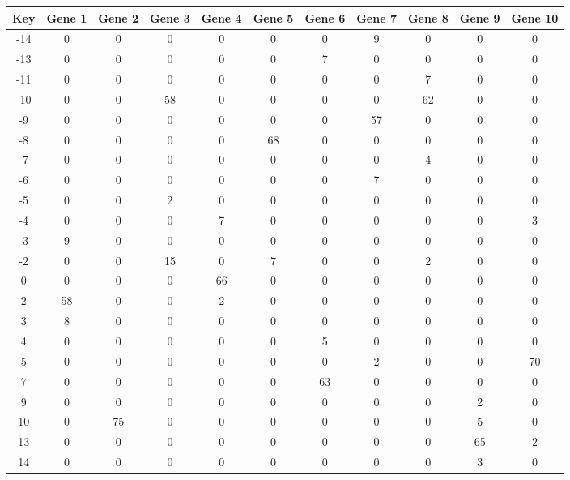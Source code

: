 \begin{tabular}{|c|c|c|c|c|c|c|c|c|c|c|}
\hline
Key & Gene 1 & Gene 2 & Gene 3 & Gene 4 & Gene 5 & Gene 6 & Gene 7 & Gene 8 & Gene 9 & Gene 10 \\
\hline
-14 & 0 & 0 & 0 & 0 & 0 & 0 & 9 & 0 & 0 & 0 \\
-13 & 0 & 0 & 0 & 0 & 0 & 7 & 0 & 0 & 0 & 0 \\
-11 & 0 & 0 & 0 & 0 & 0 & 0 & 0 & 7 & 0 & 0 \\
-10 & 0 & 0 & 58 & 0 & 0 & 0 & 0 & 62 & 0 & 0 \\
-9 & 0 & 0 & 0 & 0 & 0 & 0 & 57 & 0 & 0 & 0 \\
-8 & 0 & 0 & 0 & 0 & 68 & 0 & 0 & 0 & 0 & 0 \\
-7 & 0 & 0 & 0 & 0 & 0 & 0 & 0 & 4 & 0 & 0 \\
-6 & 0 & 0 & 0 & 0 & 0 & 0 & 7 & 0 & 0 & 0 \\
-5 & 0 & 0 & 2 & 0 & 0 & 0 & 0 & 0 & 0 & 0 \\
-4 & 0 & 0 & 0 & 7 & 0 & 0 & 0 & 0 & 0 & 3 \\
-3 & 9 & 0 & 0 & 0 & 0 & 0 & 0 & 0 & 0 & 0 \\
-2 & 0 & 0 & 15 & 0 & 7 & 0 & 0 & 2 & 0 & 0 \\
0 & 0 & 0 & 0 & 66 & 0 & 0 & 0 & 0 & 0 & 0 \\
2 & 58 & 0 & 0 & 2 & 0 & 0 & 0 & 0 & 0 & 0 \\
3 & 8 & 0 & 0 & 0 & 0 & 0 & 0 & 0 & 0 & 0 \\
4 & 0 & 0 & 0 & 0 & 0 & 5 & 0 & 0 & 0 & 0 \\
5 & 0 & 0 & 0 & 0 & 0 & 0 & 2 & 0 & 0 & 70 \\
7 & 0 & 0 & 0 & 0 & 0 & 63 & 0 & 0 & 0 & 0 \\
9 & 0 & 0 & 0 & 0 & 0 & 0 & 0 & 0 & 2 & 0 \\
10 & 0 & 75 & 0 & 0 & 0 & 0 & 0 & 0 & 5 & 0 \\
13 & 0 & 0 & 0 & 0 & 0 & 0 & 0 & 0 & 65 & 2 \\
14 & 0 & 0 & 0 & 0 & 0 & 0 & 0 & 0 & 3 & 0 \\
\hline
\end{tabular}